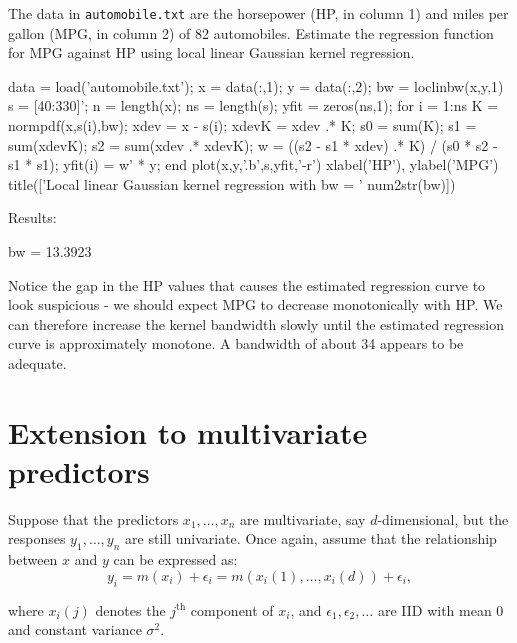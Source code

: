 \begin{labwork}
The data in {\tt automobile.txt} are the horsepower (HP, in column 1) and miles per gallon (MPG, in column 2) of 82 automobiles. Estimate the regression function for MPG against HP using local linear Gaussian kernel regression.

\begin{VrbM}
data = load('automobile.txt');
x = data(:,1);
y = data(:,2);
bw = loclinbw(x,y,1)
s = [40:330]';
n = length(x);
ns = length(s);
yfit = zeros(ns,1);
for i = 1:ns
    K = normpdf(x,s(i),bw);
    xdev = x - s(i);
    xdevK = xdev .* K;
    s0 = sum(K);
    s1 = sum(xdevK);
    s2 = sum(xdev .* xdevK);
    w = ((s2 - s1 * xdev) .* K) / (s0 * s2 - s1 * s1);
    yfit(i) = w' * y;
end
plot(x,y,'.b',s,yfit,'-r')
xlabel('HP'), ylabel('MPG')
title(['Local linear Gaussian kernel regression with bw = ' num2str(bw)])
\end{VrbM}
Results:
\begin{VrbM}
bw = 13.3923
\end{VrbM}
Notice the gap in the HP values that causes the estimated regression curve to look suspicious - we should expect MPG to decrease monotonically with HP. We can therefore increase the kernel bandwidth slowly until the estimated regression curve is approximately monotone. A bandwidth of about 34 appears to be adequate.
\end{labwork}

\section{Extension to multivariate predictors}
Suppose that the predictors $x_1,\ldots,x_n$ are multivariate, say $d$-dimensional, but the responses $y_1,\ldots,y_n$ are still univariate. Once again, assume that the relationship between $x$ and $y$ can be expressed as:
\begin{equation}
y_i=m(x_i)+\epsilon_i=m(x_i(1),\ldots,x_i(d))+\epsilon_i,
\end{equation}

where $x_i(j)$ denotes the $j^{\textrm{th}}$ component of $x_i$, and $\epsilon_1,\epsilon_2,\ldots$ are IID with mean 0 and constant variance $\sigma^2$.

